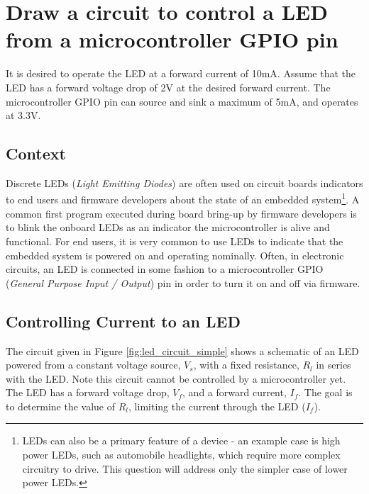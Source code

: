 \documentclass[main.tex]{subfiles}
\begin{document}
\section{Draw a circuit to control a LED from a microcontroller GPIO pin} \label{section:led} 

It is desired to operate the LED at a forward current of 10mA. Assume that the LED has a forward voltage drop of 2V at the desired forward current. The microcontroller GPIO pin can source and sink a maximum of 5mA, and operates at 3.3V.

\spoilerline

\subsection{Context}
Discrete LEDs (\textit{Light Emitting Diodes}) are often used on circuit boards indicators to end users and firmware developers about the state of an embedded system\footnote{LEDs can also be a primary feature of a device - an example case is high power LEDs, such as automobile headlights, which require more complex circuitry to drive. This question will address only the simpler case of lower power LEDs.}. A common first program executed during board bring-up by firmware developers is to blink the onboard LEDs as an indicator the microcontroller is alive and functional. For end users, it is very common to use LEDs to indicate that the embedded system is powered on and operating nominally. Often, in electronic circuits, an LED is connected in some fashion to a microcontroller GPIO (\textit{General Purpose Input / Output}) pin in order to turn it on and off via firmware. 

\subsection{Controlling Current to an LED} 
\noindent The circuit given in Figure \ref{fig:led_circuit_simple} shows a schematic of an LED powered from a constant voltage source, $V_s$, with a fixed resistance, $R_l$ in series with the LED. Note this circuit cannot be controlled by a microcontroller yet. The LED has a forward voltage drop, $V_f$, and a forward current, $I_f$. The goal is to determine the value of $R_l$, limiting the current through the LED ($I_f$).
\end{document}
